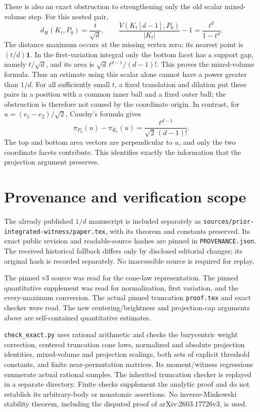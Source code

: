 \documentclass[11pt]{article}
\begin{document}
There is also an exact obstruction to strengthening only the old scalar
mixed-volume step.
For this nested pair,
\[
 d_H(K_t,P_0)=\frac{t}{\sqrt d},\qquad
 \frac{V(K_t[d-1],P_0)}{|K_t|}-1
       =\frac{t^d}{1-t^d}.
\]
The distance maximum occurs at the missing vertex zero; its nearest
point is $(t/d)\mathbf1$.
In the first-variation integral only the bottom facet has a support gap,
namely $t/\sqrt d$, and its area is
$\sqrt d\,t^{d-1}/(d-1)!$. This proves the mixed-volume formula.
Thus an estimate using this scalar alone cannot have a power greater
than $1/d$.
For all sufficiently small $t$, a fixed translation and dilation put
these pairs in a position with a common inner ball and a fixed outer ball;
the obstruction is therefore not caused by the coordinate origin.
In contrast, for $u=(e_1-e_2)/\sqrt2$, Cauchy's formula gives
\[
 \pi_{P_0}(u)-\pi_{K_t}(u)
 =\frac{t^{d-1}}{\sqrt2\,(d-1)!}.
\]
The top and bottom area vectors are perpendicular to $u$, and only
the two coordinate facets contribute. This identifies exactly the
information that the projection argument preserves.

\section{Provenance and verification scope}

The already published $1/d$ manuscript is included separately as
\nolinkurl{sources/prior-integrated-witness/paper.tex}, with its theorem
and constants preserved. Its exact public revision and readable-source
hashes are pinned in \texttt{PROVENANCE.json}. The received historical
fallback differs only by disclosed editorial changes; its original hash
is recorded separately. No inaccessible source is required for replay.

The pinned v3 source was read for the cone-law representation.
The pinned quantitative supplement was read for normalization,
first variation, and the every-maximum conversion.
The actual pinned truncation \texttt{proof.tex} and exact checker were read.
The new centering/brightness and projection-cap arguments above are
self-contained quantitative estimates.

\texttt{check\_exact.py} uses rational arithmetic and checks the barycentric
weight correction, centered truncation cone laws, normalized and absolute
projection identities, mixed-volume and projection scalings, both sets
of explicit threshold constants, and finite near-permutation matrices.
Its moment/witness regressions enumerate actual rational samples.
The inherited truncation checker is replayed in a separate directory.
Finite checks supplement the analytic proof and do not establish its
arbitrary-body or nonatomic assertions.
No inverse-Minkowski stability theorem, including the disputed proof of
arXiv:2603.17726v3, is used.
\end{document}
